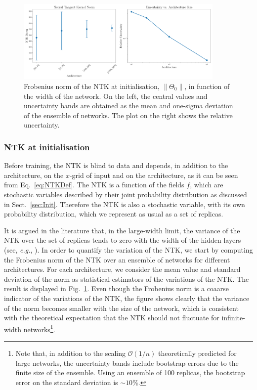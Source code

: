 \begin{figure}[t!]
  \centering
  \includegraphics[width=0.90\textwidth]{figs/section_3/ntk_initialization_with_uncertainty.pdf}
  \caption{Frobenius norm of the NTK at initialisation, $\lVert \Theta_0
  \rVert$, in function of the width of the network. On the left, the central
  values and uncertainty bands are obtained as the mean and one-sigma deviation
  of the ensemble of networks. The plot on the right shows the relative
  uncertainty.}
  \label{fig:NTKInit}
\end{figure}

\subsubsection{NTK at initialisation}
\label{sec:NTKAtInit}

Before training, the NTK is blind to data and depends, in addition to the
architecture, on the $x$-grid of input and on the architecture, as it can be
seen from Eq.~\eqref{eq:NTKDef}. The NTK is a function of the fields $f$, which
are stochastic variables described by their joint probability distribution as
discussed in Sect.~\ref{sec:Init}. Therefore the NTK is also a stochastic
variable, with its own probability distribution, which we represent as usual as
a set of replicas. 

It is argued in the literature that, in the large-width limit, the variance of
the NTK over the set of replicas tends to zero with the width of the hidden
layers (see, \textit{e.g.}, \cite{Roberts:2021fes}). In order to quantify the
variation of the NTK, we start by computing the Frobenius norm of the NTK over
an ensemble of networks for different architectures. For each architecture, we
consider the mean value and standard deviation of the norm as statistical
estimators of the variations of the NTK. The result is displayed in
Fig.~\ref{fig:NTKInit}. Even though the Frobenius norm is a coaarse indicator of
the variations of the NTK, the figure shows clearly that the variance of the
norm becomes smaller with the size of the network, which is consistent with the
theoretical expectation that the NTK should not fluctuate for infinite-width
networks\footnote{Note that, in addition to the scaling $\mathcal{O}(1/n)$
theoretically predicted for large networks, the uncertainty bands include
bootstrap errors due to the finite size of the ensemble. Using an ensemble of
100 replicas, the bootstrap error on the standard deviation is $\sim 10\%$.}.

